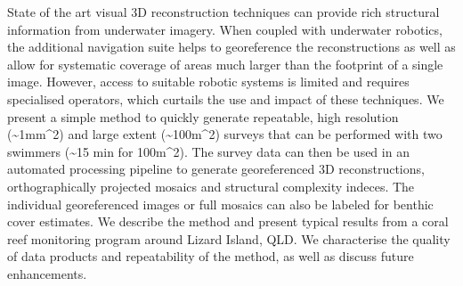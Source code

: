 
State of the art visual 3D reconstruction techniques can provide rich structural information from underwater imagery. When coupled with underwater robotics, the additional navigation suite helps to georeference the reconstructions as well as allow for systematic coverage of areas much larger than the footprint of a single image. However, access to suitable robotic systems is limited and requires specialised operators, which curtails the use and impact of these techniques.
We present a simple method to quickly generate repeatable, high resolution (\sim{1mm^{2}}) and large extent (\sim{100m^{2}}) surveys that can be performed with two swimmers (\sim{15 min} for {100m^{2}}). The survey data can then be used in an automated processing pipeline to generate georeferenced 3D reconstructions, orthographically projected mosaics and structural complexity indeces. The individual georeferenced images or full mosaics can also be labeled for benthic cover estimates.
We describe the method and present typical results from a coral reef monitoring program around Lizard Island, QLD. We characterise the quality of data products and repeatability of the method, as well as discuss future enhancements.
  
  